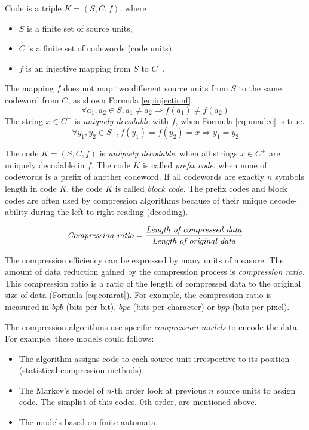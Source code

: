 \documentclass[thesis=M,english]{FITthesis}[2019/12/23]
\begin{document}
Code is a triple $K=(S,C,f)$, where

\begin{itemize}
	\item $S$ is a finite set of source units,
	\item $C$ is a finite set of codewords (code units),
	\item $f$ is an injective mapping from $S$ to $C^+$.
\end{itemize}
The mapping $f$ does not map two different source units from $S$ to the same codeword from $C$, as shown Formula \ref{eq:injectionf}.
\begin{equation} \label{eq:injectionf}
\forall a_1,a_2 \in S,a_1 \neq a_2 \Rightarrow f(a_1) \neq f(a_2)
\end{equation}
The string $x \in C^+$ is \textit{uniquely decodable} with $f$, when Formula \ref{eq:unadec} is true.
\begin{equation} \label{eq:unadec}
\forall y_1,y_2 \in S^+,f(y_1)=f(y_2)=x \Rightarrow y_1=y_2
\end{equation}

The code $K=(S,C,f)$ is \textit{uniquely decodable}, when all strings $x \in C^+$ are uniquely decodable  in $f$. The code $K$ is called \textit{prefix code}, when none of codewords is a prefix of another codeword. If all codewords are exactly $n$ symbols length in code $K$, the code $K$ is called \textit{block code}. The prefix codes and block codes are often used by compression algorithms because of their unique decode-ability during the left-to-right reading (decoding).

\begin{equation} \label{eq:comrat}
\textrm{\textit{Compression ratio}} = \frac{\textrm{\textit{Length of compressed data}}}{\textrm{\textit{Length of original data}}}
\end{equation}

The compression efficiency can be expressed by many units of measure. The amount of data reduction gained by the compression process is \textit{compression ratio}. This compression ratio is a ratio of the length of compressed data to the original size of data (Formula \ref{eq:comrat}).
For example, the compression ratio is measured in $bpb$ (bits per bit), $bpc$ (bits per character) or $bpp$ (bits per pixel). 

The compression algorithms use specific \textit{compression models} to encode the data. For example, these models could follows:
\begin{itemize}
	\item The algorithm assigns code to each source unit irrespective to its position (statistical compression methods).
	\item The Markov's model of $n$-th order look at previous $n$ source units to assign code. The simplist of this codes, 0th order, are mentioned above.
	\item The models based on finite automata.
\end{itemize}
\end{document}
